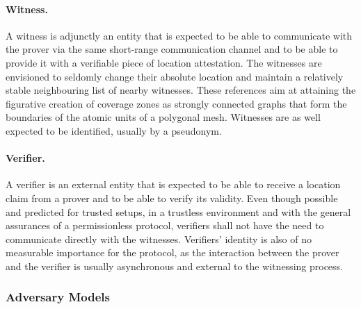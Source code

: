 \paragraph{Witness.} A witness is adjunctly an entity that is expected to be able to communicate with the prover via the same short-range communication channel and to be able to provide it with a verifiable piece of location attestation. The witnesses are envisioned to seldomly change their absolute location and maintain a relatively stable neighbouring list of nearby witnesses. These references aim at attaining the figurative creation of coverage zones as strongly connected graphs that form the boundaries of the atomic units of a polygonal mesh. Witnesses are as well expected to be identified, usually by a pseudonym.

\paragraph{Verifier.} A verifier is an external entity that is expected to be able to receive a location claim from a prover and to be able to verify its validity. Even though possible and predicted for trusted setups, in a trustless environment and with the general assurances of a permissionless protocol, verifiers shall not have the need to communicate directly with the witnesses. Verifiers' identity is also of no measurable importance for the protocol, as the interaction between the prover and the verifier is usually asynchronous and external to the witnessing process.

\subsubsection{Adversary Models}
